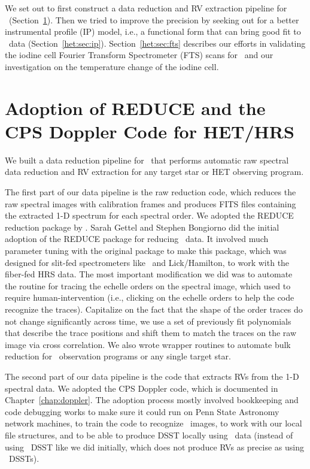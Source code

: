 We set out to first construct a data reduction and RV extraction
pipeline for \het\ (Section~\ref{het:sec:pipeline}). Then we tried to
improve the precision by seeking out for a better instrumental profile
(IP) model, i.e., a functional form that can bring good fit to \het\
data (Section~\ref{het:sec:ip}). Section~\ref{het:sec:fts} describes
our efforts in validating the iodine cell Fourier Transform
Spectrometer (FTS) scans for \het\ and our investigation on the
temperature change of the iodine cell.


\section{Adoption of REDUCE and the CPS Doppler Code for
  HET/HRS}\label{het:sec:pipeline} 

We built a data reduction pipeline for \het\ that performs automatic
raw spectral data reduction and RV extraction for any target star or
HET observing program.

The first part of our data pipeline is the raw reduction code, which
reduces the raw spectral images with calibration frames and produces
FITS files containing the extracted 1-D spectrum for each spectral
order.  We adopted the REDUCE reduction package by
\cite{2002A&A...385.1095P}. Sarah Gettel and Stephen Bongiorno did the
initial adoption of the REDUCE package for reducing \het\ data. It
involved much parameter tuning with the original package to make
this package, which was designed for slit-fed spectrometers
like \keck\ and Lick/Hamilton, to work with the fiber-fed HRS data.
The most important modification we did was to automate the routine for
tracing the echelle orders on the spectral image, which used to
require human-intervention (i.e., clicking on the echelle orders to
help the code recognize the traces). Capitalize on the fact that the
shape of the order traces do not change significantly across time, we
use a set of previously fit polynomials that describe the trace
positions and shift them to match the traces on the raw image via
cross correlation. We also wrote wrapper routines to automate bulk
reduction for \het\ observation programs or any single target star.

The second part of our data pipeline is the code that extracts RVs
from the 1-D spectral data. We adopted the CPS Doppler code, which is
documented in Chapter~\ref{chap:doppler}. The adoption process mostly
involved bookkeeping and code debugging works to make sure it could
run on Penn State Astronomy network machines, to train
the code to recognize \het\ images, to work with our local file
structures, and to be able to produce DSST locally using \het\ data
(instead of using \keck\ DSST like we did initially, which does not
produce RVs as precise as using \het\ DSSTs). 

